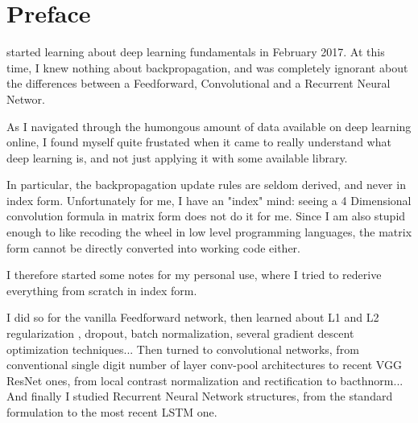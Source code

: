 \chapter{Preface}

 started learning about deep learning fundamentals in February 2017. At this time, I knew nothing about backpropagation, and was completely ignorant about the differences between a Feedforward, Convolutional and a Recurrent Neural Networ.

\vspace{0.2cm}

As I navigated through the humongous amount of data available on deep learning online, I found myself quite frustated when it came to really understand what deep learning is, and not just applying it with some available library. 

\vspace{0.2cm}

In particular, the backpropagation update rules are seldom derived, and never in index form. Unfortunately for me, I have an "index" mind: seeing a 4 Dimensional convolution formula in matrix form does not do it for me. Since I am also stupid enough to like recoding the wheel in low level programming languages, the matrix form cannot be directly converted into working code either. 


\vspace{0.2cm}

I therefore started some notes for my personal use, where I tried to rederive everything from scratch in index form.

\vspace{0.2cm}

I did so for the vanilla Feedforward network, then learned about L1 and L2 regularization , dropout\cite{Srivastava:2014:DSW:2627435.2670313}, batch normalization\cite{Ioffe2015}, several gradient descent optimization techniques... Then turned to convolutional networks, from conventional single digit number of layer conv-pool architectures\cite{Lecun98gradient-basedlearning} to recent VGG\cite{DBLP:journals/corr/SimonyanZ14a} ResNet\cite{He2015} ones, from local contrast normalization and rectification to bacthnorm... And finally I studied Recurrent Neural Network structures\cite{GravesA2016}, from the standard formulation to the most recent LSTM one\cite{Gers:2000:LFC:1121912.1121915}.

\vspace{0.2cm}


